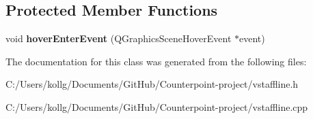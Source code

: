 \subsection*{Protected Member Functions}
\begin{DoxyCompactItemize}
\item 
\hypertarget{class_v_staff_line_aa1c1f06139ef4647c7555c1c2693eb15}{}void {\bfseries hover\+Enter\+Event} (Q\+Graphics\+Scene\+Hover\+Event $\ast$event)\label{class_v_staff_line_aa1c1f06139ef4647c7555c1c2693eb15}

\end{DoxyCompactItemize}


The documentation for this class was generated from the following files\+:\begin{DoxyCompactItemize}
\item 
C\+:/\+Users/kollg/\+Documents/\+Git\+Hub/\+Counterpoint-\/project/vstaffline.\+h\item 
C\+:/\+Users/kollg/\+Documents/\+Git\+Hub/\+Counterpoint-\/project/vstaffline.\+cpp\end{DoxyCompactItemize}
